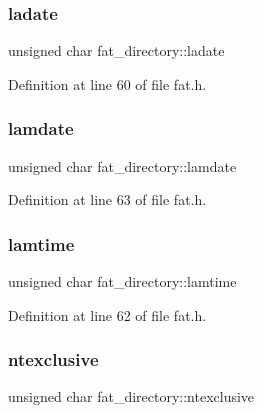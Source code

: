 \subsubsection{\texorpdfstring{ladate}{ladate}}
{\footnotesize\ttfamily unsigned char fat\+\_\+directory\+::ladate}



Definition at line 60 of file fat.\+h.

\mbox{\label{structfat__directory_a9aef03a8fc10dd13abe417d792313fc1_a9aef03a8fc10dd13abe417d792313fc1}} 
\subsubsection{\texorpdfstring{lamdate}{lamdate}}
{\footnotesize\ttfamily unsigned char fat\+\_\+directory\+::lamdate}



Definition at line 63 of file fat.\+h.

\mbox{\label{structfat__directory_aa010db7b1599af6f1e7ee527219c9f8d_aa010db7b1599af6f1e7ee527219c9f8d}} 
\subsubsection{\texorpdfstring{lamtime}{lamtime}}
{\footnotesize\ttfamily unsigned char fat\+\_\+directory\+::lamtime}



Definition at line 62 of file fat.\+h.

\mbox{\label{structfat__directory_ad259390d9a31a807cdff543b5b10d9f5_ad259390d9a31a807cdff543b5b10d9f5}} 
\subsubsection{\texorpdfstring{ntexclusive}{ntexclusive}}
{\footnotesize\ttfamily unsigned char fat\+\_\+directory\+::ntexclusive}



